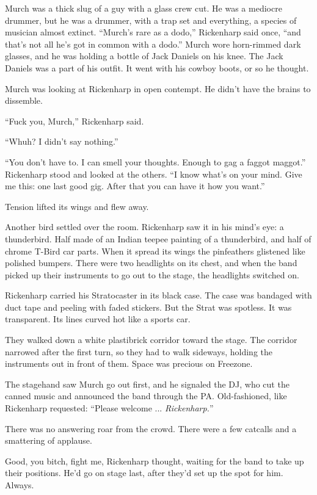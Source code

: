 Murch was a thick slug of a guy with a glass crew cut. He was a mediocre drummer, but he was a drummer, with a trap set and everything, a species of musician almost extinct. ``Murch's rare as a dodo,'' Rickenharp said once, ``and that's not all he's got in common with a dodo.'' Murch wore horn-rimmed dark glasses, and he was holding a bottle of Jack Daniels on his knee. The Jack Daniels was a part of his outfit. It went with his cowboy boots, or so he thought.

Murch was looking at Rickenharp in open contempt. He didn't have the brains to dissemble.

``Fuck you, Murch,'' Rickenharp said.

``Whuh? I didn't say nothing.''

``You don't have to. I can smell your thoughts. Enough to gag a faggot maggot.'' Rickenharp stood and looked at the others. ``I know what's on your mind. Give me this: one last good gig. After that you can have it how you want.''

Tension lifted its wings and flew away.

Another bird settled over the room. Rickenharp saw it in his mind's eye: a thunderbird. Half made of an Indian teepee painting of a thunderbird, and half of chrome T-Bird car parts. When it spread its wings the pinfeathers glistened like polished bumpers. There were two headlights on its chest, and when the band picked up their instruments to go out to the stage, the headlights switched on.

Rickenharp carried his Stratocaster in its black case. The case was bandaged with duct tape and peeling with faded stickers. But the Strat was spotless. It was transparent. Its lines curved hot like a sports car.

They walked down a white plastibrick corridor toward the stage. The corridor narrowed after the first turn, so they had to walk sideways, holding the instruments out in front of them. Space was precious on Freezone.

The stagehand saw Murch go out first, and he signaled the DJ, who cut the canned music and announced the band through the PA. Old-fashioned, like Rickenharp requested: ``Please welcome ... \textit{Rickenharp.}''

There was no answering roar from the crowd. There were a few catcalls and a smattering of applause.

Good, you bitch, fight me, Rickenharp thought, waiting for the band to take up their positions. He'd go on stage last, after they'd set up the spot for him. Always.

